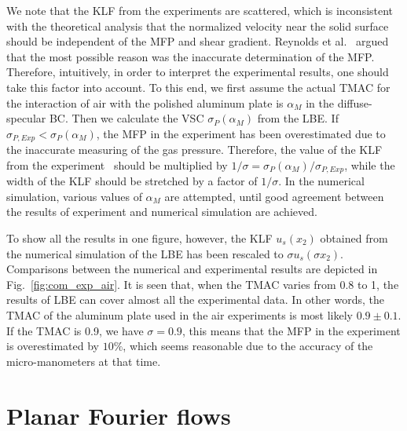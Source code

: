We note that the KLF from the experiments are scattered, which is inconsistent with the theoretical analysis that the normalized velocity near the solid surface should be independent of the MFP and shear gradient. Reynolds et al.~\cite{reynolds1974velocity} argued that the most possible reason was the inaccurate determination of the MFP. Therefore, intuitively, in order to interpret the experimental results, one should take this factor into account. To this end, we first assume the actual TMAC for the interaction of air with the polished aluminum plate is $\alpha_M$ in the diffuse-specular BC. Then we calculate the VSC $\sigma_P(\alpha_M)$ from the LBE. If $\sigma_{P,Exp}<\sigma_P(\alpha_M)$, the MFP in the experiment has been overestimated due to the inaccurate  measuring of the gas pressure. Therefore, the value of the KLF from the experiment~\cite{reynolds1974velocity} should be multiplied by  $1/\sigma=\sigma_P(\alpha_M)/\sigma_{P,Exp}$, while the width of the KLF should be stretched by a factor of $1/\sigma$. In the numerical simulation, various values of $\alpha_M$ are attempted, until good agreement between the results of experiment and numerical simulation are achieved.   





To show all the results in one figure, however, the KLF $u_s(x_2)$ obtained from the numerical simulation of the LBE has been rescaled to $\sigma{u_s}(\sigma{}x_2)$. Comparisons between the numerical and experimental results are depicted in Fig.~\ref{fig:com_exp_air}. It is seen that, when the TMAC varies from 0.8 to 1, the results of LBE can cover almost all the experimental data. In other words, the TMAC of the aluminum plate used in the air experiments is most likely $0.9\pm0.1$. If the TMAC is 0.9, we have $\sigma=0.9$, this means that the MFP in the experiment is overestimated by $10\%$, which seems reasonable due to the accuracy of the micro-manometers at that time.


\section{Planar Fourier flows}\label{Fourier_lin_FSM}


